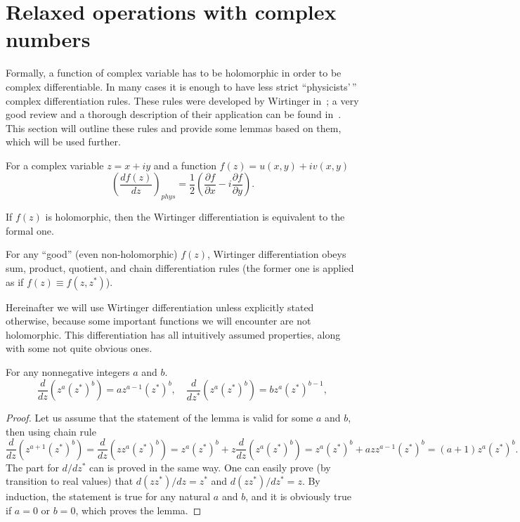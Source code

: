 \section{Relaxed operations with complex numbers}

Formally, a function of complex variable has to be holomorphic in order to be complex differentiable.
In many cases it is enough to have less strict ``physicists'\,'' complex differentiation rules.
These rules were developed by Wirtinger in~\cite{Wirtinger1927};
a very good review and a thorough description of their application can be found in~\cite{Kreutz-Delgado2009}.
This section will outline these rules and provide some lemmas based on them, which will be used further.

For a complex variable $z = x + iy$ and a function $f(z) = u(x, y) + iv(x, y)$
\[
	\left( \frac{df(z)}{dz} \right)_{phys}
	= \frac{1}{2} \left(
		\frac{\partial f}{\partial x} - i \frac{\partial f}{\partial y}
	\right).
\]

\begin{lemma}
If $f(z)$ is holomorphic, then the Wirtinger differentiation is equivalent to the formal one.
\end{lemma}

\begin{lemma}
For any ``good'' (even non-holomorphic) $f(z)$, Wirtinger differentiation obeys sum, product, quotient, and chain differentiation rules
(the former one is applied as if $f(z) \equiv f(z, z^*)$).
\end{lemma}

Hereinafter we will use Wirtinger differentiation unless explicitly stated otherwise,
because some important functions we will encounter are not holomorphic.
This differentiation has all intuitively assumed properties, along with some not quite obvious ones.

\begin{lemma}
For any nonnegative integers $a$ and $b$.
\[
	\frac{d}{dz} (z^a (z^*)^b) = a z^{a-1} (z^*)^b,
	\quad
	\frac{d}{dz^*} (z^a (z^*)^b) = b z^a (z^*)^{b-1},
\]
\end{lemma}
\begin{proof}
Let us assume that the statement of the lemma is valid for some $a$ and $b$, then using chain rule
\[
	\frac{d}{dz} (z^{a+1} (z^*)^b)
	= \frac{d}{dz} (z z^a (z^*)^b)
	= z^a (z^*)^b + z \frac{d}{dz} (z^a (z^*)^b)
	= z^a (z^*)^b + a z z^{a-1} (z^*)^b
	= (a + 1) z^a (z^*)^b.
\]
The part for $d/dz^*$ can is proved in the same way.
One can easily prove (by transition to real values) that $d(z z^*)/dz = z^*$ and $d(z z^*)/dz^* = z$.
By induction, the statement is true for any natural $a$ and $b$,
and it is obviously true if $a = 0$ or $b = 0$, which proves the lemma.
\end{proof}

